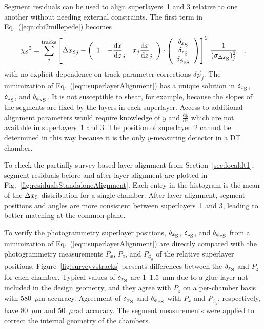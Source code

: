 Segment residuals can be used to align superlayers~1 and 3 relative to
one another without needing external constraints.  The first term in
Eq.~(\ref{eqn:chi2millepede}) becomes
\begin{equation}
{\chi_{\mbox{\scriptsize S}}}^2 =
\sum_j^{\mbox{\scriptsize tracks}}
\left[\Delta {x_{\mbox{\scriptsize S}}}_j
- \bigg(\begin{array}{c c c}
1 & -\dfrac{\textrm{d}x}{\textrm{d}z}_j & x_j \dfrac{\textrm{d}x}{\textrm{d}z}_j \\
\end{array}\bigg) \cdot \left(\begin{array}{c}
\delta_{x_{\mbox{\scriptsize S}}} \\ \delta_{z_{\mbox{\scriptsize S}}} \\ \delta_{{\phi_y}_{\mbox{\scriptsize S}}} \\
\end{array} \right) \right]^2 \, \frac{1}{(\sigma_{{\Delta x_{\mbox{\scriptsize S}}}})_j^2} \quad\mbox{,}
\label{eqn:superlayerAlignment}
\end{equation}
with no explicit dependence on track parameter corrections
$\delta \vec{p}_j$.  The minimization of
Eq.~(\ref{eqn:superlayerAlignment}) has a unique solution in
$\delta_{x_{\mbox{\scriptsize S}}}$, $\delta_{z_{\mbox{\scriptsize
S}}}$, and $\delta_{{\phi_y}_{\mbox{\scriptsize S}}}$.  It is not
susceptible to shear, for example, because the slopes of the
segments are fixed by the layers in each superlayer.  Access to
additional alignment parameters would require knowledge of $y$ and
$\frac{\textrm{d}y}{\textrm{d}z}$ which are not available in superlayers~1 and 3.  The
position of superlayer~2 cannot be determined in this way because it
is the only $y$-measuring detector in a DT chamber.

To check the partially survey-based layer alignment from
Section~\ref{sec:localdt1}, segment residuals before and after
layer alignment are plotted in Fig.~\ref{fig:residualsStandaloneAlignment}.  Each
entry in the histogram is the mean of the $\Delta x_{\mbox{\scriptsize
S}}$ distribution for a single chamber.  After layer alignment,
segment positions and angles are more consistent between superlayers~1
and 3, leading to better matching at the common plane.

To verify the photogrammetry superlayer positions, 
$\delta_{x_{\mbox{\scriptsize S}}}$, $\delta_{z_{\mbox{\scriptsize
S}}}$, and $\delta_{{\phi_y}_{\mbox{\scriptsize S}}}$ from a
minimization of Eq.~(\ref{eqn:superlayerAlignment}) are directly compared with the
photogrammetry measurements $P_x$, $P_z$, and $P_{\phi_y}$ of the
relative superlayer positions.
Figure~\ref{fig:surveyvstracks} presents differences between the
$\delta_{z_{\mbox{\scriptsize S}}}$ and $P_z$ for each chamber.
Typical values of $\delta_{z_{\mbox{\scriptsize S}}}$ are 1--1.5~mm
due to a glue layer not included in the design geometry, and they
agree with $P_z$ on a per-chamber basis with 580~$\mu$m accuracy.
Agreement of $\delta_{x_{\mbox{\scriptsize S}}}$ and
$\delta_{{\phi_y}_{\mbox{\scriptsize S}}}$ with $P_x$ and
$P_{\phi_y}$, respectively, have 80~$\mu$m and 50~$\mu$rad accuracy.
The segment measurements were applied to correct the internal geometry
of the chambers.

